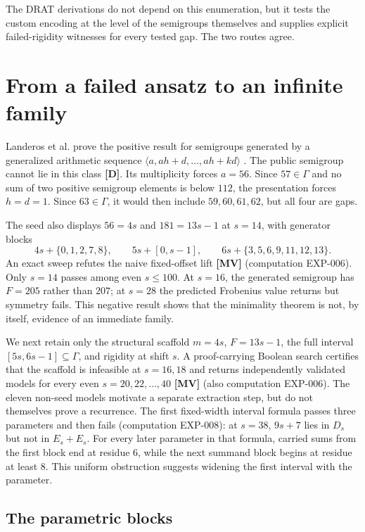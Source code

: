 \documentclass[11pt]{article}
\theoremstyle{definition}
\theoremstyle{remark}
\begin{document}
The DRAT derivations do not depend on this enumeration, but it tests the custom encoding at the
level of the semigroups themselves and supplies explicit failed-rigidity witnesses for every
tested gap. The two routes agree.

\section{From a failed ansatz to an infinite family}

Landeros et al. prove the positive result for semigroups generated by a generalized arithmetic
sequence $\langle a,ah+d,\ldots,ah+kd\rangle$ \cite{Landeros2024}. The public semigroup cannot lie
in this class \textbf{[D]}. Its multiplicity forces $a=56$. Since $57\in\Gamma$ and no sum of two
positive semigroup elements is below $112$, the presentation forces $h=d=1$. Since
$63\in\Gamma$, it would then include $59,60,61,62$, but all four are gaps.

The seed also displays $56=4s$ and $181=13s-1$ at $s=14$, with generator blocks
\[
4s+\{0,1,2,7,8\},\qquad 5s+[0,s-1],\qquad
6s+\{3,5,6,9,11,12,13\}.
\]
An exact sweep refutes the naive fixed-offset lift \textbf{[MV]} (computation EXP-006). Only
$s=14$ passes among even $s\le100$. At $s=16$, the generated semigroup has $F=205$ rather than
$207$; at $s=28$ the predicted Frobenius value returns but symmetry fails. This negative result
shows that the minimality theorem is not, by itself, evidence of an immediate family.

We next retain only the structural scaffold $m=4s$, $F=13s-1$, the full interval
$[5s,6s-1]\subseteq\Gamma$, and rigidity at shift $s$. A proof-carrying Boolean search certifies
that the scaffold is infeasible at $s=16,18$ and returns independently validated models for every
even $s=20,22,\ldots,40$ \textbf{[MV]} (also computation EXP-006). The eleven non-seed models
motivate a separate extraction step, but do not themselves prove a recurrence. The first
fixed-width interval formula passes three parameters and then fails (computation EXP-008): at
$s=38$, $9s+7$ lies in $D_s$ but not in $E_s+E_s$. For every later parameter in that formula, carried sums from the first block end at residue $6$, while the
next summand block begins at residue at least $8$. This uniform obstruction suggests widening the
first interval with the parameter.

\subsection{The parametric blocks}
\end{document}
